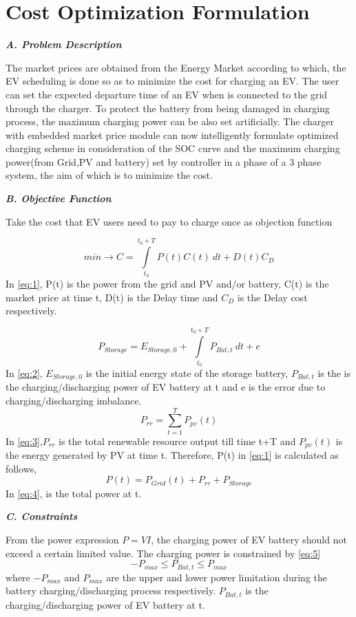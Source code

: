 \documentclass{article}
\begin{document}
\section{Cost Optimization Formulation}\label{chap:Cost Optimization Formulation}

\textit{\textbf{A. Problem Description}}

The market prices are obtained from the Energy Market according to which, the EV scheduling is done so as to minimize the cost for charging an EV. The user can set the expected departure time of an EV when is connected to the grid through the charger. To protect the battery from being damaged in charging process,
the maximum charging power can be also set artificially. The charger with embedded market price module can now intelligently formulate optimized charging scheme in consideration of the SOC curve and the maximum charging power(from Grid,PV and battery) set by controller in a phase of a 3 phase system, the aim of which is to minimize the cost.

\textit{\textbf{B. Objective Function}}

Take the cost that EV users need to pay to charge once as objection function

\[ min\rightarrow C = \int\limits_{t_0}^{t_0+T} P(t)C(t) \ dt + D(t){C_D} \tag{1} \label{eq:1}\]            
In \eqref{eq:1}, P(t) is the power from the grid and PV and/or battery, C(t) is the market price at time t, D(t) is the Delay time and \({C_D}\) is the Delay cost respectively.

\[{P_{Storage}} = {E_{Storage,0}}+\int\limits_{t_0}^{t_0+T} {P_{Bat,t}} \ dt + e \tag{2} \label{eq:2}\]
In \eqref{eq:2}, \({E_{Storage,0}}\) is the initial energy state of the storage battery, \({P_{Bat,t}}\) is the is the charging/discharging power of EV battery at t and e is the error due to charging/discharging imbalance.
\[{P_{rr}} = \sum\limits_{t=1}^{T} {P_{pv}(t)} \tag{3} \label{eq:3}\]
In \eqref{eq:3},\({P_{rr}}\)  is the total renewable resource output till time t+T and \({P_{pv}(t)}\) is the energy generated by PV at time t.
Therefore, P(t) in \eqref{eq:1} is calculated as follows,
\[P(t) = {P_{Grid}(t)}+{P_{rr}}+{P_{Storage}}\tag{4} \label{eq:4}\]
In \eqref{eq:4}, is the total power at t.

\textit{\textbf{C. Constraints}}

From the power expression \(P= VI\), the charging power of EV battery should not exceed a certain limited value. The charging power is constrained by \eqref{eq:5}
\[-{P_{max}}\leq {P_{Bat,t}} \leq {P_{max}}\tag{5} \label{eq:5}\]
where \(-{P_{max}}\) and \({P_{max}}\) are the upper and lower power limitation during the battery charging/discharging process respectively. \({P_{Bat,t}}\) is the charging/discharging power of EV battery at t. 
\end{document}
